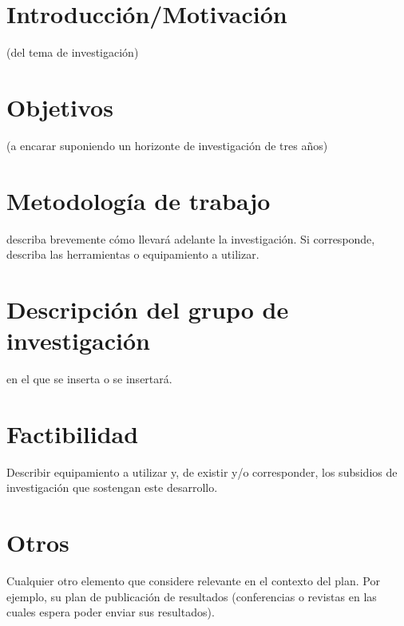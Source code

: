 
\section{Introducción/Motivación} 
    (del tema de investigación)

\section{Objetivos} 
    (a encarar suponiendo un horizonte de investigación de tres años)

\section{Metodología de trabajo}
describa brevemente cómo llevará adelante la
investigación. Si corresponde, describa las herramientas o equipamiento a utilizar.

\section{Descripción del grupo de investigación}
en el que se inserta o se insertará.

\section{Factibilidad}

Describir equipamiento a utilizar y, de existir y/o
corresponder, los subsidios
de investigación que sostengan este desarrollo.

\section{Otros}

Cualquier otro elemento que considere relevante en el contexto del
plan. Por ejemplo, su plan de publicación de resultados (conferencias o revistas en las
cuales espera poder enviar sus resultados).

